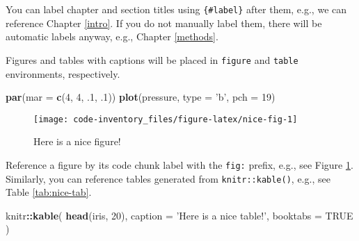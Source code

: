 \documentclass[
]{book}
\newenvironment{Shaded}{\begin{snugshade}}{\end{snugshade}}
\newcommand{\DataTypeTok}[1]{\textcolor[rgb]{0.13,0.29,0.53}{#1}}
\newcommand{\DecValTok}[1]{\textcolor[rgb]{0.00,0.00,0.81}{#1}}
\newcommand{\FloatTok}[1]{\textcolor[rgb]{0.00,0.00,0.81}{#1}}
\newcommand{\KeywordTok}[1]{\textcolor[rgb]{0.13,0.29,0.53}{\textbf{#1}}}
\newcommand{\NormalTok}[1]{#1}
\newcommand{\OperatorTok}[1]{\textcolor[rgb]{0.81,0.36,0.00}{\textbf{#1}}}
\newcommand{\OtherTok}[1]{\textcolor[rgb]{0.56,0.35,0.01}{#1}}
\newcommand{\StringTok}[1]{\textcolor[rgb]{0.31,0.60,0.02}{#1}}
\begin{document}
You can label chapter and section titles using \texttt{\{\#label\}} after them, e.g., we can reference Chapter \ref{intro}. If you do not manually label them, there will be automatic labels anyway, e.g., Chapter \ref{methods}.

Figures and tables with captions will be placed in \texttt{figure} and \texttt{table} environments, respectively.

\begin{Shaded}
\begin{Highlighting}[]
\KeywordTok{par}\NormalTok{(}\DataTypeTok{mar =} \KeywordTok{c}\NormalTok{(}\DecValTok{4}\NormalTok{, }\DecValTok{4}\NormalTok{, }\FloatTok{.1}\NormalTok{, }\FloatTok{.1}\NormalTok{))}
\KeywordTok{plot}\NormalTok{(pressure, }\DataTypeTok{type =} \StringTok{'b'}\NormalTok{, }\DataTypeTok{pch =} \DecValTok{19}\NormalTok{)}
\end{Highlighting}
\end{Shaded}

\begin{figure}

{\centering \texttt{[image: code-inventory\_files/figure-latex/nice-fig-1]} 

}

\caption{Here is a nice figure!}\label{fig:nice-fig}
\end{figure}

Reference a figure by its code chunk label with the \texttt{fig:} prefix, e.g., see Figure \ref{fig:nice-fig}. Similarly, you can reference tables generated from \texttt{knitr::kable()}, e.g., see Table \ref{tab:nice-tab}.

\begin{Shaded}
\begin{Highlighting}[]
\NormalTok{knitr}\OperatorTok{::}\KeywordTok{kable}\NormalTok{(}
  \KeywordTok{head}\NormalTok{(iris, }\DecValTok{20}\NormalTok{), }\DataTypeTok{caption =} \StringTok{'Here is a nice table!'}\NormalTok{,}
  \DataTypeTok{booktabs =} \OtherTok{TRUE}
\NormalTok{)}
\end{Highlighting}
\end{Shaded}
\end{document}
